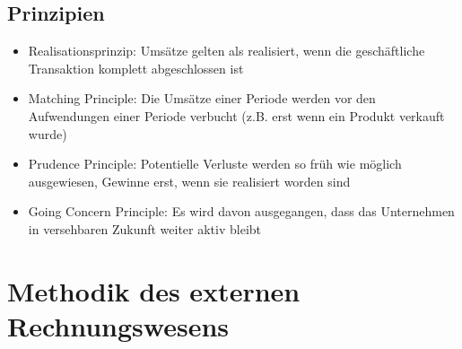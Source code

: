 \subsection{Prinzipien}
\begin{itemize}
	\item Realisationsprinzip: Umsätze gelten als realisiert, wenn die geschäftliche Transaktion komplett abgeschlossen ist
	\item Matching Principle: Die Umsätze einer Periode werden vor den Aufwendungen einer Periode verbucht (z.B. erst wenn ein Produkt verkauft wurde)
	\item Prudence Principle: Potentielle Verluste werden so früh wie möglich ausgewiesen, Gewinne erst, wenn sie realisiert worden sind
	\item Going Concern Principle: Es wird davon ausgegangen, dass das Unternehmen in versehbaren Zukunft weiter aktiv bleibt
\end{itemize}



\section{Methodik des externen Rechnungswesens}

